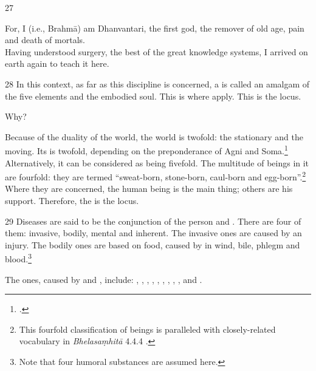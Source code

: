 \begin{translation}
    \item[27]           
    \begin{sloka}
        For, I (i.e., Brahmā) am Dhanvantari, the first god, the remover of old age, 
        pain and 
        death of mortals.\\ Having understood surgery, the best of the great 
        knowledge 
        systems, I arrived on earth again to teach it here.
    \end{sloka}    
    
    
    \item[28] In this context, as far as this discipline is concerned, a 
     is called an amalgam of the five elements 
    and the embodied soul.  This is where  apply. This 
    is the locus. 
    
    Why?
    
    Because of the duality of the world, the world is twofold: the stationary
    and the moving. Its  is twofold, depending on the
    preponderance of Agni and Soma.\footcite[See][]{wuja-2004}  Alternatively,
    it can be considered as being fivefold.  The multitude of beings in it are
    fourfold: they are termed “sweat-born, stone-born, caul-born and
    egg-born”.\footnote{This fourfold classification of beings is paralleled
    with closely-related vocabulary in  \emph{Bhelasaṃhitā} 4.4.4	
    \parencites[206]{kris-2000}[81]{mook-1921}.}  Where they are concerned, the
    human being is the main thing; others are his support.  Therefore, the
     is the locus.
    
    \item[29]  Diseases are said to be the conjunction of the person and 
    .
    There are four of them: invasive, bodily, mental and inherent.  The invasive ones 
    are caused by an injury.  The bodily ones are based on food, caused by 
     in wind, bile, phlegm and blood.\footnote{Note 
    that four humoral substances are assumed here.} 
    
    The  ones, caused by 
     and 
    , 
    include:  
    , 
    , 
    , 
    , 
    , 
    ,
    ,
    ,
    , 
    and
    .
    

\end{translation}
